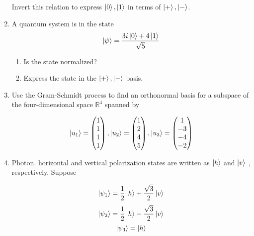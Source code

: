 \documentclass{article}
\begin{document}
\begin{enumerate}
Invert this relation to express ${\ket{0} , \ket{1} }$ in terms of ${\ket{+} , \ket{-} }$.

\item A quantum system is in the state
\[ \ket{\psi}=\frac{3i\ket{0}+4\ket{1}}{\sqrt{5}} \] 

\begin{enumerate}
\item Is the state normalized?
\item Express the state in the $\ket{+}, \ket{-}$ basis.
\end{enumerate}




\item Use the Gram-Schmidt process to find an orthonormal basis for a subspace of
the four-dimensional space $\mathbb{R}^{4}$ spanned by

\[ \ket{u_{1}}=
\begin{pmatrix}
1\\
1\\
1\\
1\\
\end{pmatrix},  
\ket{u_{2}}=
\begin{pmatrix}
1\\
2\\
4\\
5\\
\end{pmatrix},
\ket{u_{3}}=
\begin{pmatrix}
1\\
-3\\
-4\\
-2\\
\end{pmatrix}
 \]

\item Photon. horizontal and vertical polarization states are written as $\ket{h}$ and $\ket{v}$ ,
respectively. Suppose

\[ \ket{\psi_{1}}=\frac{1}{2}\ket{h}+\frac{\sqrt{3}}{2}\ket{v} \] 
\[ \ket{\psi_{2}}=\frac{1}{2}\ket{h}-\frac{\sqrt{3}}{2}\ket{v} \] 
\[ \ket{\psi_{3}}=\ket{h} \] 
\end{enumerate}









\end{document}
